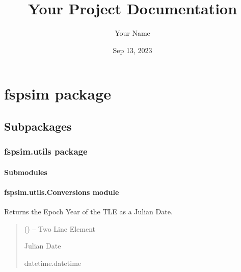 \documentclass[letterpaper,10pt,english]{sphinxmanual}
\title{Your Project Documentation}
\date{Sep 13, 2023}
\author{Your Name}
\begin{document}
\pagestyle{empty}
\sphinxmaketitle
\pagestyle{plain}
\sphinxtableofcontents
\pagestyle{normal}
\label{\detokenize{index::doc}}


\sphinxstepscope


\chapter{fspsim package}
\label{\detokenize{fspsim:fspsim-package}}\label{\detokenize{fspsim::doc}}

\section{Subpackages}
\label{\detokenize{fspsim:subpackages}}
\sphinxstepscope


\subsection{fspsim.utils package}
\label{\detokenize{fspsim.utils:fspsim-utils-package}}\label{\detokenize{fspsim.utils::doc}}

\subsubsection{Submodules}
\label{\detokenize{fspsim.utils:submodules}}

\subsubsection{fspsim.utils.Conversions module}
\label{\detokenize{fspsim.utils:module-fspsim.utils.Conversions}}\label{\detokenize{fspsim.utils:fspsim-utils-conversions-module}}

\begin{fulllineitems}
\label{\detokenize{fspsim.utils:fspsim.utils.Conversions.TLE_time}}
\pysigstartsignatures
{}
\pysigstopsignatures
\sphinxAtStartPar
Returns the Epoch Year of the TLE as a Julian Date.
\begin{quote}\begin{description}
\sphinxAtStartPar
{} () – Two Line Element

\sphinxAtStartPar
Julian Date

\sphinxAtStartPar
datetime.datetime

\end{description}\end{quote}

\end{fulllineitems}
\end{document}
